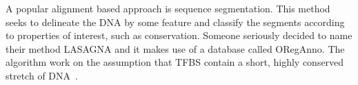             
            A popular alignment based approach is sequence segmentation. This method seeks to delineate the DNA by some feature and classify the segments according to properties of interest, such as conservation.
            Someone seriously decided to name their method LASAGNA and it makes use of a database called ORegAnno. The algorithm work on the assumption that TFBS contain a short, highly conserved stretch of DNA~\cite{lee2013lasagna}.
